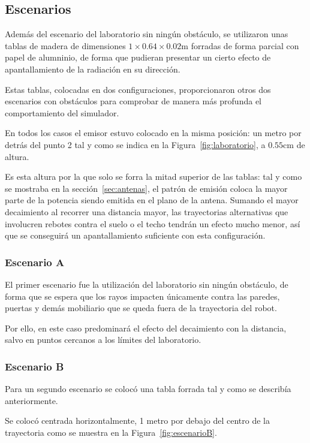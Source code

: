 \subsection{Escenarios}

Además del escenario del laboratorio sin ningún obstáculo, se utilizaron unas tablas de madera de dimensiones $1 \times 0.64 \times 0.02\si{\meter}$ forradas de forma parcial con papel de alumninio, de forma que pudieran presentar un cierto efecto de apantallamiento de la radiación en su dirección.

Estas tablas, colocadas en dos configuraciones, proporcionaron otros dos escenarios con obstáculos para comprobar de manera más profunda el comportamiento del simulador.

En todos los casos el emisor estuvo colocado en la misma posición: un metro por detrás del punto 2 tal y como se indica en la Figura~\ref{fig:laboratorio}, a $0.55\si{\centi\meter}$ de altura.

Es esta altura por la que solo se forra la mitad superior de las tablas: tal y como se mostraba en la sección~\ref{sec:antenas}, el patrón de emisión coloca la mayor parte de la potencia siendo emitida en el plano de la antena.
Sumando el mayor decaimiento al recorrer una distancia mayor, las trayectorias alternativas que involucren rebotes contra el suelo o el techo tendrán un efecto mucho menor, así que se conseguirá un apantallamiento suficiente con esta configuración.

\subsubsection{Escenario A}

El primer escenario fue la utilización del laboratorio sin ningún obstáculo, de forma que se espera que los rayos impacten únicamente contra las paredes, puertas y demás mobiliario que se queda fuera de la trayectoria del robot.

Por ello, en este caso predominará el efecto del decaimiento con la distancia, salvo en puntos cercanos a los límites del laboratorio.

\subsubsection{Escenario B}

Para un segundo escenario se colocó una tabla forrada tal y como se describía anteriormente.

Se colocó centrada horizontalmente, 1 metro por debajo del centro de la trayectoria como se muestra en la Figura~\ref{fig:escenarioB}.

